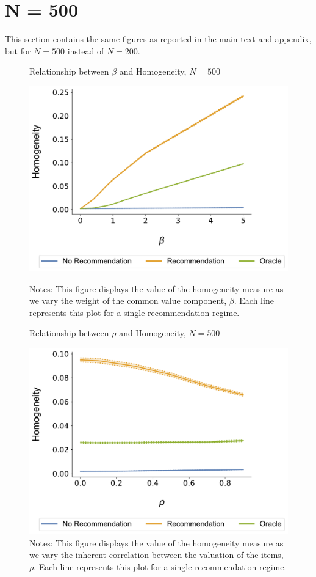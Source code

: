 \documentclass[format=acmsmall, review=true]{acmart}
\begin{document}
\addtocounter{figure}{-1}
\clearpage

\section{N = 500}

This section contains the same figures as reported in the main text and appendix, but for $N = 500$ instead of $N = 200$.

\begin{figure}[ht]
\caption{Relationship between $\beta$ and Homogeneity, $N = 500$}
\includegraphics[width=.45\linewidth]{figures/beta_homogeneity_N_500_T_20}\label{fig:beta_homo}
\caption*{\scriptsize Notes: This figure displays the value of the homogeneity measure as we vary the weight of the common value component, $\beta$. Each line represents this plot for a single recommendation regime.}
\end{figure}
\begin{figure}[ht]
\caption{Relationship between $\rho$ and Homogeneity, $N = 500$}
\includegraphics[width=.45\linewidth]{figures/rho_homogeneity_N_500_T_20}
\caption*{\scriptsize Notes: This figure displays the value of the homogeneity measure as we vary the inherent correlation between the valuation of the items, $\rho$. Each line represents this plot for a single recommendation regime.}\label{fig:cor_homo}
\end{figure}
\end{document}
